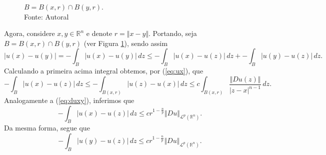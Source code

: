\documentclass[a4paper, 11pt]{book}
\theoremstyle{definition}
\newcommand{\bR}{\mathbb{R}}
\newcommand{\cL}{\mathcal{L}}
\newcommand{\sint}{-\!\!\!\!\!\!\int}
\begin{document}
\begin{prf}
    \begin{figure}
        \centering
        \caption{$B = B(x,r) \cap B(y,r)$.\\
        Fonte: Autoral}
        \label{fig:B}
    \end{figure}
    Agora, considere $x, y \in \bR^n$ e denote $r = \Vert x - y \Vert$. Portando, seja $B = B(x,r) \cap B(y,r)$ (ver Figura \ref{fig:B}), sendo assim
    \begin{equation} \label{eq:abcd}
        |u(x) - u(y)| = \sint_{B} |u(x) - u(y)| \,dz \leqslant \sint_{B} |u(x) - u(z)| \,dz + \sint_B |u(y) - u(z)| \,dz.
    \end{equation}
    Calculando a primeira acima integral obtemos, por (\ref{eq:ux}), que
    \[
        \sint_B |u(x) - u(z)| \,dz \leqslant \sint_{B(x,r)} |u(z) - u(x)| \,dz \leqslant c \int_{B(x,r)} \frac{\Vert Du(z) \Vert}{|z-x|^{n-1}} \,dz.
    \]
    Analogamente a (\ref{eq:duxy}), inferimos que
    \[
        \sint_B |u(x) - u(z)| \,dz \leqslant cr^{1 - \frac{n}{p}} \Vert Du \Vert_{\cL^p(\bR^n)}.
    \]
    Da mesma forma, segue que
    \[
        \sint_B |u(y) - u(z)| \,dz \leqslant cr^{1 - \frac{n}{p}} \Vert Du \Vert_{\cL^p(\bR^n)}.
    \]


\end{prf}
\end{document}
